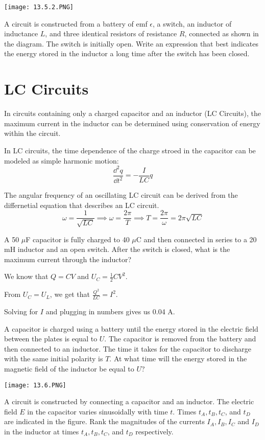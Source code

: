 \documentclass[../em.tex]{subfiles}
\begin{document}
\ex \begin{center}
    \texttt{[image: 13.5.2.PNG]}
\end{center}
A circuit is constructed from a battery of emf $\epsilon$, a switch, an inductor of inductance $L$, and three identical resistors of resistance $R$, connected as shown in the diagram. The switch is initially open.
Write an expression that best indicates the energy stored in the inductor a long time after the switch has been closed.

\section{LC Circuits}
In circuits containing only a charged capacitor and an inductor (LC Circuits), the maximum current in the inductor 
can be determined using conservation of energy within the circuit.

In LC circuits, the time dependence of the charge stroed in the capacitor can be modeled as simple harmonic motion:
\[ \frac{\dd^2 q}{\dd t^2} = -\frac{I}{LC}q \]

The angular frequency of an oscillating LC circuit can be derived from the differnetial equation that describes an LC circuit.
\[ \omega = \frac{1}{\sqrt{LC}} \implies \omega = \frac{2\pi}{T} \implies T = \frac{2\pi}{\omega} = 2\pi\sqrt{LC}\]

\begin{example}
    A 50 $\mu$F capacitor is fully charged to 40 $\mu$C and then connected in series to a 20 mH inductor and an open switch. After the switch is closed, what is the maximum current through the inductor?

    We know that $Q=CV$ and $U_C=\frac{1}{2}CV^2$.

    From $U_C=U_L$, we get that $\frac{Q^2}{LC}=I^2$.

    Solving for $I$ and plugging in numbers gives us 0.04 A.
\end{example}

\ex A capacitor is charged using a battery until the energy stored in the electric field between the plates is equal to $U$. The capacitor is removed from the battery and then connected to an inductor.
The time it takes for the capacitor to discharge with the same initial polarity is $T$. At what time will the energy stored in the magnetic field of the inductor be equal to $U$?

\ex \begin{center}
    \texttt{[image: 13.6.PNG]}
\end{center}
A circuit is constructed by connecting a capacitor and an inductor. The electric field $E$ in the capacitor varies sinusoidally with time $t$. Times $t_A, t_B, t_C$, and $t_D$ are indicated in the figure.
Rank the magnitudes of the currents $I_A, I_B, I_C$ and $I_D$ in the inductor at times $t_A, t_B, t_C$, and $t_D$ respectively.
\end{document}

